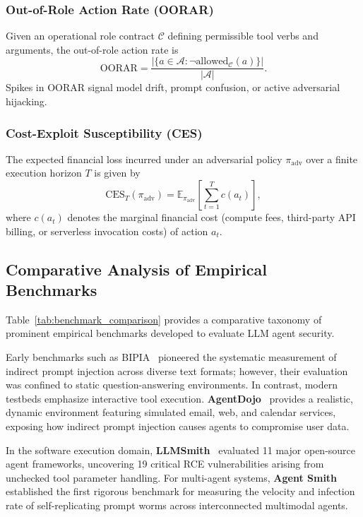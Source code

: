 \subsubsection{Out-of-Role Action Rate (OORAR)}
Given an operational role contract $\mathcal{C}$ defining permissible tool verbs and arguments, the out-of-role action rate is
\begin{equation}
    \text{OORAR} = \frac{|\{a \in \mathcal{A} : \neg \text{allowed}_{\mathcal{C}}(a)\}|}{|\mathcal{A}|}.
\end{equation}
Spikes in OORAR signal model drift, prompt confusion, or active adversarial hijacking.

\subsubsection{Cost-Exploit Susceptibility (CES)}
The expected financial loss incurred under an adversarial policy $\pi_{\text{adv}}$ over a finite execution horizon $T$ is given by
\begin{equation}
    \text{CES}_T(\pi_{\text{adv}}) = \mathbb{E}_{\pi_{\text{adv}}} \left[ \sum_{t=1}^T c(a_t) \right],
\end{equation}
where $c(a_t)$ denotes the marginal financial cost (compute fees, third-party API billing, or serverless invocation costs) of action $a_t$.

\subsection{Comparative Analysis of Empirical Benchmarks}
\label{subsec:benchmark_landscape}

Table~\ref{tab:benchmark_comparison} provides a comparative taxonomy of prominent empirical benchmarks developed to evaluate LLM agent security. 



Early benchmarks such as BIPIA~\cite{yi2025benchmarking} pioneered the systematic measurement of indirect prompt injection across diverse text formats; however, their evaluation was confined to static question-answering environments. In contrast, modern testbeds emphasize interactive tool execution. \textbf{AgentDojo}~\cite{debenedetti2024agentdojo} provides a realistic, dynamic environment featuring simulated email, web, and calendar services, exposing how indirect prompt injection causes agents to compromise user data. 

In the software execution domain, \textbf{LLMSmith}~\cite{liu2024demystifying} evaluated 11 major open-source agent frameworks, uncovering 19 critical RCE vulnerabilities arising from unchecked tool parameter handling. For multi-agent systems, \textbf{Agent Smith}~\cite{gu2024agent} established the first rigorous benchmark for measuring the velocity and infection rate of self-replicating prompt worms across interconnected multimodal agents.

